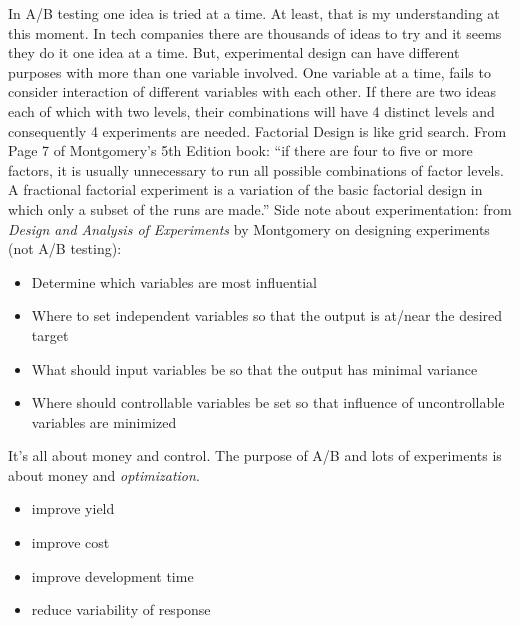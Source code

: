 \begin{tcolorbox}[colback=aliceblue!10!white,colframe=blue!70!black,title=\textbf{A short break}]
In A/B testing one idea is tried at a time. At least, that is my understanding
at this moment. In tech companies there are thousands of ideas to try
and it seems they do it one idea at a time.
But, experimental design can have different purposes with
more than one variable involved. 
One variable at a time, fails to consider interaction of different variables 
with each other.
If there are two ideas each of which with two levels, their combinations will have 4 distinct 
levels and consequently 4 experiments are needed. 
Factorial Design is like grid search. From Page 7 of Montgomery's 5th Edition book: 
``if there are four to five or more factors, it is usually unnecessary to run
all possible combinations of factor levels. A fractional factorial experiment is a variation of the basic factorial design in which only a subset of the runs are made.''
Side note about experimentation: from \emph{Design and Analysis of Experiments}
by Montgomery on designing experiments (not A/B testing):
\begin{itemize}
\setlength\itemsep{0pt}
\item Determine which variables are most influential
\item Where to set independent variables so that the output is at/near the desired target
\item What should input variables be so that the output has minimal variance
\item Where should controllable variables be set so that influence of uncontrollable variables are minimized
\end{itemize}
\end{tcolorbox}




\begin{tcolorbox}[colback=aliceblue!10!white,colframe=blue!70!black,title=\textbf{Follow the Money}]
It's all about money and control. 
The purpose of A/B and lots of experiments is about money
and \emph{optimization}.
\begin{itemize}
\setlength\itemsep{0pt}
\item improve yield
\item improve cost
\item improve development time
\item reduce variability of response
\end{itemize}
\end{tcolorbox}



